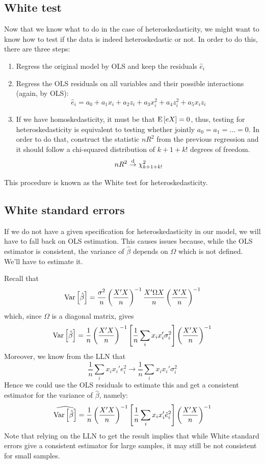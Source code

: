 \subsection{White test}

Now that we know what to do in the case of heteroskedasticity, we might want to know how to test if the data is indeed heteroskedastic or not. In order to do this, there are three steps:\begin{enumerate}
\item Regress the original model by OLS and keep the residuals $\hat e_i$
\item Regress the OLS residuals on all variables and their possible interactions (again, by OLS): $$ \hat e_i = a_0 + a_1x_i + a_2z_i + a_3x_i^2 + a_4z_i^2 + a_5x_iz_i $$
\item If we have homoskedasticity, it must be that $\operatorname{E}\left[eX\right] = 0$, thus, testing for heteroskedasticity is equivalent to testing whether jointly $a_0 = a_1 = ... = 0$. In order to do that, construct the statistic $nR^2$ from the previous regression and it should follow a chi-squared distribution of $k + 1 + k!$ degrees of freedom. $$nR^2\overset{\text{d}}{\to} \chi_{k+1+k!}^2$$
\end{enumerate} This procedure is known as the White test for heteroskedasticity. 

\subsection{White standard errors}

If we do not have a given specification for heteroskedasticity in our model, we will have to fall back on OLS estimation. This causes issues because, while the OLS estimator is consistent, the variance of $\hat\beta$ depends on $\Omega$ which is not defined. We'll have to estimate it.

Recall that $$\operatorname{Var}\left[\hat\beta\right] = \frac{\sigma^2}{n}\left(\frac{X'X}{n}\right)^{-1}\frac{X'\Omega X}{n}\left(\frac{X'X}{n}\right)^{-1} $$ which, since $\Omega$ is a diagonal matrix, gives $$
\operatorname{Var}\left[\hat\beta\right] = \frac{1}{n}\left(\frac{X'X}{n}\right)^{-1}\left[\frac{1}{n}\sum_{i}x_ix_i'\sigma_i^2\right]\left(\frac{X'X}{n}\right)^{-1}
$$ Moreover, we know from the LLN that $$\frac{1}{n}\sum_{i}x_ix_i'e_i^2 \to \frac{1}{n}\sum_{i}x_ix_i'\sigma_i^2 $$ Hence we could use the OLS residuals to estimate this and get a consistent estimator for the variance of $\hat\beta$, namely: $$\widehat{\operatorname{Var}\left[\hat\beta\right]} = \frac{1}{n}\left(\frac{X'X}{n}\right)^{-1}\left[\frac{1}{n}\sum_{i}x_ix_i'\hat e_i^2\right]\left(\frac{X'X}{n}\right)^{-1} $$ Note that relying on the LLN to get the result implies that while White standard errors give a consistent estimator for large samples, it may still be not consistent for small samples.

